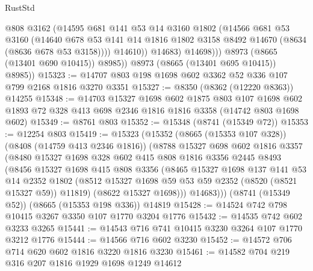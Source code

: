 \begin{lexlean}{RustStd}
\begin{coremodule}
                      @808
                      @3162
                      (@14595
                        @681
                        @141
                        @53
                        @14
                        @3160
                        @1802
                        (@14566
                          @681
                          @53
                          @3160
                          (@14640
                            @678
                            @53
                            @141
                            @14
                            @1816
                            @1802
                            @3158
                            @8492
                            @14670
                            (@8634 (@8636 @678 @53 @3158))))
                        @14610))
                    @14683)
                  @14698)))
            @8973
            (@8665 (@13401 @690 @10415))
            @8985))
        @8973
        (@8665 (@13401 @695 @10415))
        @8985))
@15323 := @14707 @803 @198 @1698 @602 @3362 @52 @336 @107 @799 @2168 @1816 @3270 @3351
@15327 := @8350 (@8362 (@12220 @8363)) @14255
@15348 := @14703
    @15327
    @1698
    @602
    @1875
    @803
    @107
    @1698
    @602
    @1893
    @72
    @328
    @413
    @698
    @2346
    @1816
    @1816
    @3358
    (@14742 @803 @1698 @602)
@15349 := @8761 @803
@15352 := @15348 (@8741 (@15349 @72))
@15353 := @12254 @803
@15419 := @15323
    (@15352
      (@8665 (@15353 @107 @328))
      (@8408 (@14759 @413 @2346 @1816))
      (@8788
        @15327
        @698
        @602
        @1816
        @3357
        (@8480
          @15327
          @1698
          @328
          @602
          @415
          @808
          @1816
          @3356
          @2445
          @8493
          (@8456
            @15327
            @1698
            @415
            @808
            @3356
            (@8465
              @15327
              @1698
              @137
              @141
              @53
              @14
              @2352
              @1802
              (@8512 @15327 @1698 @59 @53 @59 @2352 (@8520 (@8521 @15327 @59)) @11819)
              (@8622 @15327 @1698)))
          @14683)))
    (@8741 (@15349 @52))
    (@8665 (@15353 @198 @336))
    @14819
@15428 := @14524 @742 @798 @10415 @3267 @3350 @107 @1770 @3204 @1776
@15432 := @14535 @742 @602 @3233 @3265
@15441 := @14543 @716 @741 @10415 @3230 @3264 @107 @1770 @3212 @1776
@15444 := @14566 @716 @602 @3230
@15452 := @14572 @706 @714 @620 @602 @1816 @3220 @1816 @3230
@15461 := @14582 @704 @219 @316 @207 @1816 @1929 @1698 @1249 @14612

\end{coremodule}
\end{lexlean}

